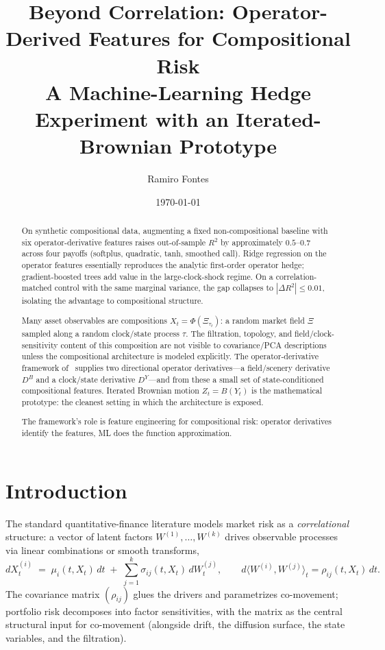 \documentclass[11pt,reqno]{amsart}
\title[Operator-Derived Features for Compositional Risk]{Beyond
       Correlation: Operator-Derived Features for
       Compositional Risk\\
       \normalsize A Machine-Learning Hedge Experiment with an
       Iterated-Brownian Prototype}
\author{Ramiro Fontes}
\date{\today}
\theoremstyle{plain}
\theoremstyle{definition}
\theoremstyle{remark}
\newcommand{\IBM}{Z}
\newcommand{\Bvar}{B}
\newcommand{\Yclock}{Y}
\begin{document}
\begin{abstract}
On synthetic compositional data, augmenting a fixed
non-compositional baseline with six operator-derivative
features raises out-of-sample $R^{2}$ by approximately
$0.5$--$0.7$ across four payoffs (softplus, quadratic, tanh,
smoothed call). Ridge regression on the operator features
essentially reproduces the analytic first-order operator hedge;
gradient-boosted trees add value in the large-clock-shock
regime. On a correlation-matched control with the same marginal
variance, the gap collapses to $|\Delta R^{2}|\le 0.01$,
isolating the advantage to compositional structure.

Many asset observables are compositions
$X_{t}=\Phi(\Xi_{\tau_{t}})$: a random market field $\Xi$
sampled along a random clock/state process $\tau$. The
filtration, topology, and field/clock-sensitivity content of
this composition are not visible to covariance/PCA descriptions
unless the compositional architecture is modeled explicitly.
The operator-derivative framework
of~\cite{GammaHierarchyDivergence,OperatorClarkOcone} supplies
two directional operator derivatives---a field/scenery
derivative $D^{\Bvar}$ and a clock/state derivative
$D^{\Yclock}$---and from these a small set of state-conditioned
compositional features. Iterated Brownian
motion $\IBM_{t}=\Bvar(\Yclock_{t})$ is the mathematical
prototype: the cleanest setting in which the architecture is
exposed.

The framework's role is feature engineering for compositional
risk: operator derivatives identify the features, ML does the
function approximation.
\end{abstract}

\maketitle

\section{Introduction}\label{sec:intro}

The standard quantitative-finance literature models market risk
as a \emph{correlational} structure: a vector of latent factors
$W^{(1)},\ldots,W^{(k)}$ drives observable processes via linear
combinations or smooth transforms,
\begin{equation}\label{eq:corr-model}
  dX^{(i)}_{t}\;=\;\mu_{i}(t,X_{t})\,dt
   \;+\;\sum_{j=1}^{k}\sigma_{ij}(t,X_{t})\,dW^{(j)}_{t},
   \qquad d\langle W^{(i)},W^{(j)}\rangle_{t}=\rho_{ij}(t,X_{t})\,dt.
\end{equation}
The covariance matrix $(\rho_{ij})$ glues the drivers and
parametrizes co-movement; portfolio risk decomposes into factor
sensitivities, with the matrix as the central structural input
for co-movement (alongside drift, the diffusion surface, the
state variables, and the filtration).
\end{document}
